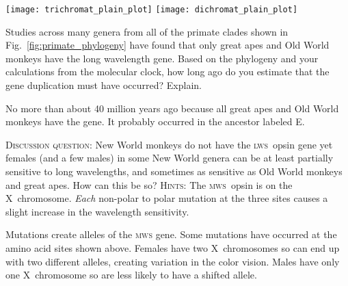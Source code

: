 \documentclass[12pt, addpoints]{exam}
\newcommand{\mws}{\textsc{mws}}
\newcommand{\lws}{\textsc{lws}}
\newcommand*\AnswerBox[2]{%
    \parbox[t][#1]{0.92\linewidth}{%
    \begin{solution}#2\end{solution}}
    \vspace{\stretch{1}}
}
\begin{document}
\begin{questions}
\bigskip

 
\parbox{\linewidth}{
\ifprintanswers
	\texttt{[image: trichromat\_plain\_plot]}
\else
	\texttt{[image: dichromat\_plain\_plot]}
\fi
{}\label{fig:relative_sensitivity}\par
}


\question
Studies across many genera from all of the primate clades shown in Fig.~\ref{fig:primate_phylogeny} have found that only great apes and Old World monkeys have the long wavelength gene. Based on the phylogeny and your calculations from the molecular clock, how long ago do you estimate that the gene duplication must have occurred?  Explain.

\AnswerBox{0.3\textheight}{No more than about 40 million years ago because all great apes and Old World monkeys have the gene. It probably occurred in the ancestor labeled E.}

\question
\textsc{Discussion question:} New World monkeys do not have the \lws{}~opsin gene yet females (and a few males) in some New World genera can be at least partially sensitive to long wavelengths, and sometimes as sensitive as Old World monkeys and great apes.  How can this be so? \textsc{Hints:} The \mws{}~opsin is on the X~chromosome. \emph{Each} non-polar to polar mutation at the three sites causes a slight increase in the wavelength sensitivity.

\AnswerBox{0.3\textheight}{Mutations create alleles of the \mws{} gene. Some mutations have occurred at the amino acid sites shown above. Females have two X~chromosomes so can end up with two different alleles, creating variation in the color vision. Males have only one X~chromosome so are less likely to have a shifted allele.}

\label{last_page}\end{questions}
\end{document}
